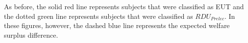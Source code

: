 \documentclass[../main.tex]{subfiles}
\begin{document}
As before, the solid red line represents subjects that were classified as EUT and the dotted green line represents subjects that were classified as $\mathit{RDU_{Prelec}}$.
In these figures, however, the dashed blue line represents the expected welfare surplus difference.

\end{document}
